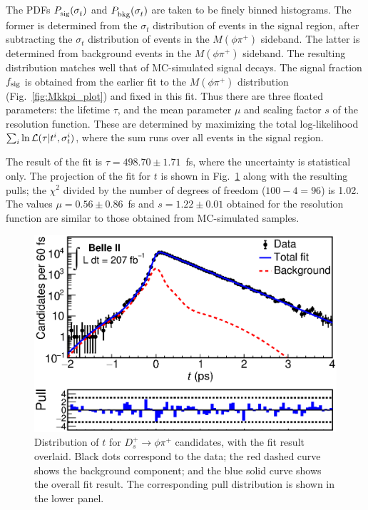 \documentclass[aps,prl,twocolumn,superscriptaddress,showpacs,preprintnumbers,amsmath,amssymb]{revtex4-2}
\def\ra{\!\rightarrow\!}
\def\Dsphipi{D^+_s\ra\phi\pi^+}
\def\sigmat{\sigma^{}_t}
\def\trec {t}
\begin{document}
The PDFs $P^{}_{\rm sig}(\sigmat)$ and $P^{}_{\rm bkg}(\sigmat)$ are taken 
to be finely binned histograms. 
The former is determined from the $\sigmat$ distribution of events in the signal region, 
after subtracting the $\sigmat$ distribution of events in the $M(\phi\pi^+)$ sideband. 
The latter is determined from background events in the $M(\phi\pi^+)$ sideband.  
The resulting distribution matches well that of MC-simulated signal decays. 
The signal fraction $f_{\rm{sig}}$ is obtained from the earlier fit to the 
$M(\phi\pi^+)$ distribution (Fig.~\ref{fig:Mkkpi_plot}) and fixed in this fit.
Thus there are three floated parameters: the lifetime $\tau$, and the 
mean parameter $\mu$ and scaling factor $s$ of the resolution function. 
These are determined by maximizing the total log-likelihood
$\sum_i \ln {\cal L}(\tau | t^i,\sigmat{}\!\!^i)$, 
where the sum runs over all events in the signal region.

The result of the fit %
is $\tau = 498.70 \pm 1.71$~fs, where the uncertainty is statistical only. 
The projection of the fit for $\trec$ is shown in Fig.~\ref{fig:datafit_tproj} 
along with the resulting pulls; the $\chi^2$ divided by the number of degrees 
of freedom ($100-4 = 96$) is 1.02.
The values $\mu = 0.56 \pm 0.86$~fs and $s=1.22 \pm 0.01$
obtained for the resolution function are similar to those 
obtained from MC-simulated samples.

\begin{figure}[ht]
    \centering
    \includegraphics[scale=0.48]{fit_data_100p.eps}
    \caption{Distribution of $\trec$ for $\Dsphipi$ candidates,
        with the fit result overlaid. Black dots correspond to the data; 
       the red dashed curve shows the background component; and the blue solid 
       curve shows the overall fit result. The corresponding pull distribution 
       is shown in the lower panel.}
    \label{fig:datafit_tproj}
\end{figure}
\end{document}
